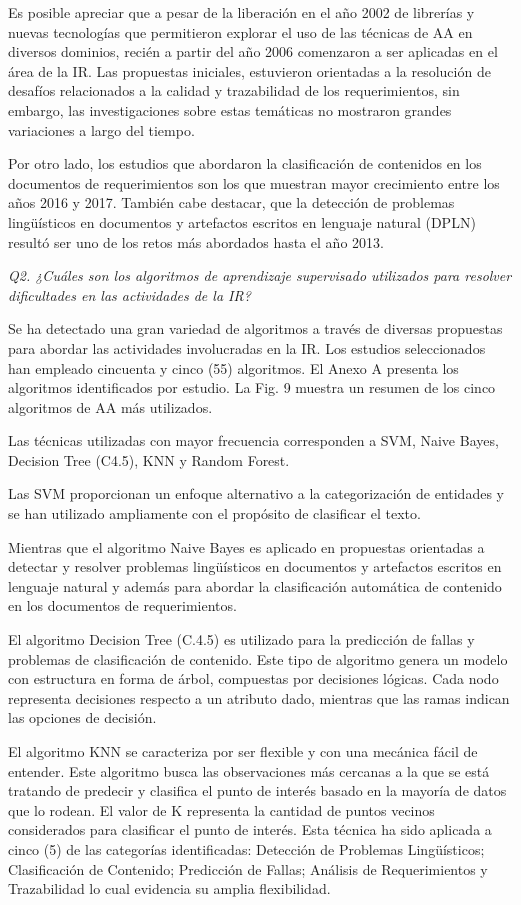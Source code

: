 \documentclass[journal]{IEEEtran}
\begin{document}
Es posible apreciar que a pesar de la liberación en el año 2002 de librerías y nuevas tecnologías que permitieron explorar el uso de las técnicas de AA en diversos dominios, recién a partir del año 2006 comenzaron a ser aplicadas en el área de la IR. Las propuestas iniciales, estuvieron orientadas a la resolución de desafíos relacionados a la calidad y trazabilidad de los requerimientos, sin embargo, las investigaciones sobre estas temáticas no mostraron grandes variaciones a largo del tiempo. 

Por otro lado, los estudios que abordaron la clasificación de contenidos en los documentos de requerimientos son los que muestran mayor crecimiento entre los años 2016 y 2017. También cabe destacar, que la detección de problemas lingüísticos en documentos y artefactos escritos en lenguaje natural (DPLN) resultó ser uno de los retos más abordados hasta el año 2013.

\emph{Q2. ¿Cuáles son los algoritmos de aprendizaje supervisado utilizados para resolver dificultades en las actividades de la IR?}

Se ha detectado una gran variedad de algoritmos a través de diversas propuestas para abordar las actividades involucradas en la IR. Los estudios seleccionados han empleado cincuenta y cinco (55) algoritmos. El Anexo A presenta los algoritmos identificados por estudio. La Fig. 9 muestra un resumen de los cinco algoritmos de AA más utilizados.

Las técnicas utilizadas con mayor frecuencia corresponden a SVM, Naive Bayes, Decision Tree (C4.5), KNN y Random Forest. 

Las SVM proporcionan un enfoque alternativo a la categorización de entidades y se han utilizado ampliamente con el propósito de clasificar el texto.

Mientras que el algoritmo Naive Bayes es aplicado en propuestas orientadas a detectar y resolver problemas lingüísticos en documentos y artefactos escritos en lenguaje natural y además para abordar la clasificación automática de contenido en los documentos de requerimientos. 

El algoritmo Decision Tree (C.4.5) es utilizado para la predicción de fallas y problemas de clasificación de contenido. Este tipo de algoritmo genera un modelo con estructura en forma de árbol, compuestas por decisiones lógicas. Cada nodo representa decisiones respecto a un atributo dado, mientras que las ramas indican las opciones de decisión. 

El algoritmo KNN se caracteriza por ser flexible y con una mecánica fácil de entender. Este algoritmo busca las observaciones más cercanas a la que se está tratando de predecir y clasifica el punto de interés basado en la mayoría de datos que lo rodean. El valor de K representa la cantidad de puntos vecinos considerados para clasificar el punto de interés. Esta técnica ha sido aplicada a cinco (5) de las categorías identificadas: Detección de Problemas Lingüísticos; Clasificación de Contenido; Predicción de Fallas; Análisis de Requerimientos y Trazabilidad lo cual evidencia su amplia flexibilidad.
\end{document}
